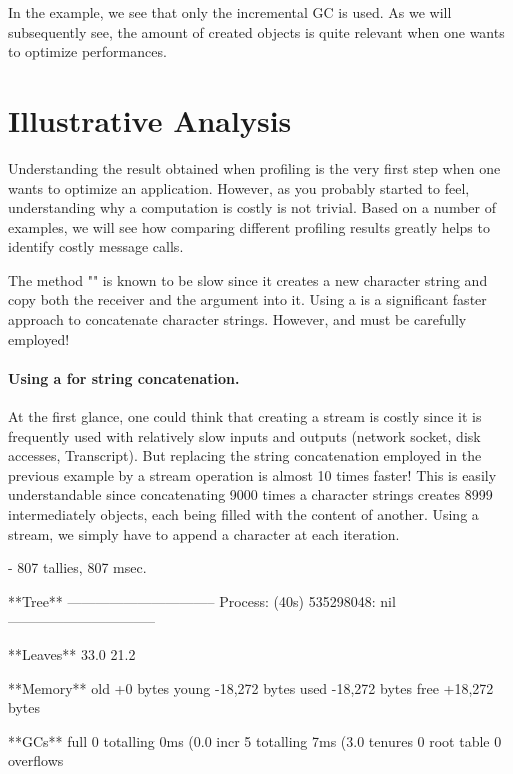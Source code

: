 \documentclass[a4paper,10pt,twoside]{book}
\begin{document}
In the example, we see that only the incremental GC is used. As we will subsequently see, the amount of created objects is quite relevant when one wants to optimize performances.

\section{Illustrative Analysis}

Understanding the result obtained when profiling is the very first step when one wants to optimize an application. However, as you probably started to feel, understanding why a computation is costly is not trivial. Based on a number of examples, we will see how comparing different profiling results greatly helps to identify costly message calls. 

The method "\ct{,}" is known to be slow since it creates a new character string and copy both the receiver and the argument into it. Using a  is a significant faster approach to concatenate character strings. However,  and  must be carefully employed!


\paragraph{Using a  for string concatenation.}
At the first glance, one could think that creating a stream is costly since it is frequently used with relatively slow inputs and outputs (\eg network socket, disk accesses, Transcript). But replacing the string concatenation employed in the previous example by a stream operation is almost 10 times faster! This is easily understandable since concatenating 9000 times a character strings creates 8999 intermediately objects, each being filled with the content of another. Using a stream, we simply have to append a character at each iteration.


\begin{code}{}

 - 807 tallies, 807 msec.

**Tree**
--------------------------------
Process: (40s)  535298048: nil
--------------------------------

**Leaves**
33.0%
21.2%

**Memory**
	old			+0 bytes
	young		-18,272 bytes
	used		-18,272 bytes
	free		+18,272 bytes

**GCs**
	full			0 totalling 0ms (0.0%
	incr		5 totalling 7ms (3.0%
	tenures		0
	root table	0 overflows
\end{code}
\end{document}
